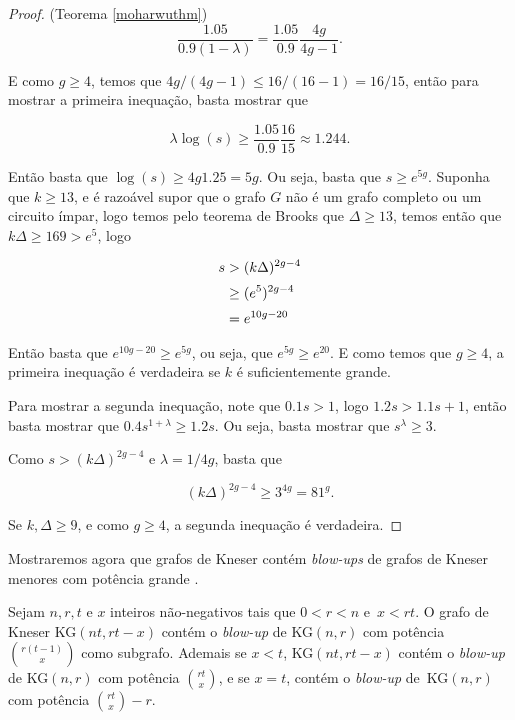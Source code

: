 \begin{proof}{(Teorema \ref{moharwuthm})}
\[\frac{1.05}{0.9(1-\lambda)} = \frac{1.05}{0.9}\frac{4g}{4g-1}.\]

E como $g\geq 4$, temos que $4g/(4g-1) \leq 16/(16-1)=16/15$, então para mostrar a primeira inequação, basta mostrar que 

\[\lambda\log(s) \geq \frac{1.05}{0.9}\frac{16}{15} \approx 1.244.\]

Então basta que $\log(s) \geq 4g1.25 = 5g$. Ou seja, basta que $s \geq e^{5g}$. Suponha que $k\geq 13$, e é razoável supor que o grafo $G$ não é um grafo completo ou um circuito ímpar, logo temos pelo teorema de Brooks que $\Delta \geq 13$, temos então que $k\Delta \geq 169 > e^{5}$, logo

\begin{equation*}
\setlength{\jot}{5pt}
\begin{aligned}
s &> (k\Delta)^{2g-4} \\
&\geq (e^{5})^{2g-4}\\
&= e^{10g-20}
\end{aligned}
\end{equation*}


Então basta que $e^{10g-20} \geq e^{5g}$, ou seja, que $e^{5g}\geq e^{20}$. E como temos que $g\geq 4$, a primeira inequação é verdadeira se $k$ é suficientemente grande.

Para mostrar a segunda inequação, note que $0.1s > 1$, logo $1.2s > 1.1s+1$, então basta mostrar que $0.4s^{1+\lambda} \geq 1.2s$. Ou seja, basta mostrar que $s^{\lambda}\geq 3$.

Como $s > (k\Delta)^{2g-4}$ e $\lambda = 1/4g$, basta que

\[(k\Delta)^{2g-4} \geq 3^{4g} = 81^g.\]

Se $k,\Delta\geq 9$, e como $g\geq 4$, a segunda inequação é verdadeira.
\end{proof}

Mostraremos agora que grafos de Kneser contém \textit{blow-ups} de grafos de Kneser menores com potência grande \cite{mohar2016dichromatic}.

\begin{teorema}\label{moharwukn}
Sejam $n,r,t$ e $x$ inteiros não-negativos tais que $0 < r < n$ e~$x < rt$. O grafo de Kneser KG$(nt, rt-x)$ contém o \textit{blow-up} de KG$(n,r)$ com potência $\binom{r(t-1)}{x}$ como subgrafo. Ademais se $x < t$, KG$(nt, rt-x)$ contém o \textit{blow-up} de KG$(n,r)$ com potência $\binom{rt}{x}$, e se $x = t$, contém o \textit{blow-up} de~KG$(n,r)$ com potência $\binom{rt}{x}-r$.
\end{teorema}

